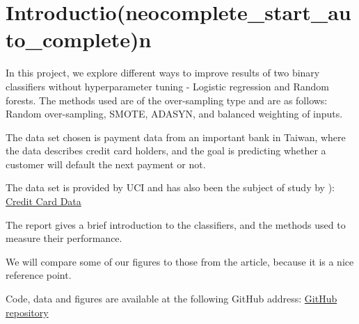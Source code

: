 \section{Introductio(neocomplete_start_auto_complete)n}
In this project, we explore different ways to improve results of two binary
classifiers without hyperparameter tuning - Logistic regression and
Random forests. The methods used are of the over-sampling type and are as
follows: Random over-sampling, SMOTE, ADASYN, and balanced weighting of
inputs.

The data set chosen is payment
data from an important bank in Taiwan, where the data describes credit card 
holders, and the goal is predicting whether a customer will default the 
next payment or not.

The data set is provided by UCI and has also been the subject of study by \cite{ComparisonData}): 
\href{https://archive.ics.uci.edu/ml/datasets/default+of+credit+card+clients}{Credit Card Data}

The report gives a brief introduction to the classifiers, and the methods
used to measure their performance.

We will compare some of our figures to those from the article, because it is
a nice reference point. 

Code, data and figures are available at the following GitHub address:
\href{https://github.com/geirtul/fys-stk4155/tree/master/project3}{GitHub repository}


